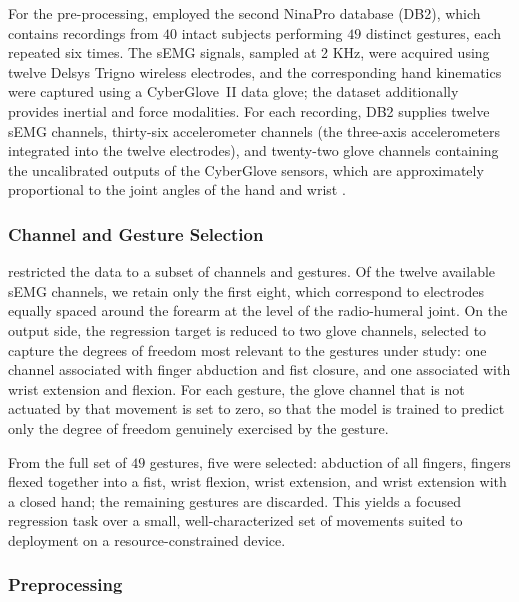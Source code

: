 \documentclass[12pt,DIV16,BCOR12mm,a4paper,footinclude=false,headinclude,parskip=half-,twoside,openright,cleardoublepage=empty,toc=index,bibliography=totoc,listof=totoc]{scrreprt}
\numberwithin{equation}{chapter}
\begin{document}
    For the pre-processing, \cite{jonasPrePrint} employed the second NinaPro database (DB2),
    which contains recordings from $40$ intact subjects performing $49$ distinct gestures, each
    repeated six times. The sEMG signals, sampled at 2 KHz, were acquired using twelve Delsys Trigno
    wireless electrodes, and the corresponding hand kinematics were captured using a
    CyberGlove~II data glove; the dataset additionally provides inertial and force
    modalities. For each recording, DB2 supplies twelve sEMG channels, thirty-six
    accelerometer channels (the three-axis accelerometers integrated into the twelve
    electrodes), and twenty-two glove channels containing the uncalibrated outputs of
    the CyberGlove sensors, which are approximately proportional to the joint angles
    of the hand and wrist \cite{atzoriCharacterizationBenchmarkDatabase2015,ninaproWebsite}.

    \subsubsection{Channel and Gesture Selection}

    \cite{jonasPrePrint} restricted the data to a subset of channels and gestures. Of the twelve
    available sEMG channels, we retain only the first eight, which correspond to
    electrodes equally spaced around the forearm at the level of the radio-humeral
    joint. On the output side, the regression target is reduced to two glove channels,
    selected to capture the degrees of freedom most relevant to the gestures under
    study: one channel associated with finger abduction and fist closure, and one
    associated with wrist extension and flexion. For each gesture, the glove channel
    that is not actuated by that movement is set to zero, so that the model is trained
    to predict only the degree of freedom genuinely exercised by the gesture.

    From the full set of $49$ gestures, five were selected: abduction of all fingers,
    fingers flexed together into a fist, wrist flexion, wrist extension, and wrist
    extension with a closed hand; the remaining gestures are discarded. This yields a
    focused regression task over a small, well-characterized set of movements suited
    to deployment on a resource-constrained device.

  \subsubsection{Preprocessing}
\end{document}
